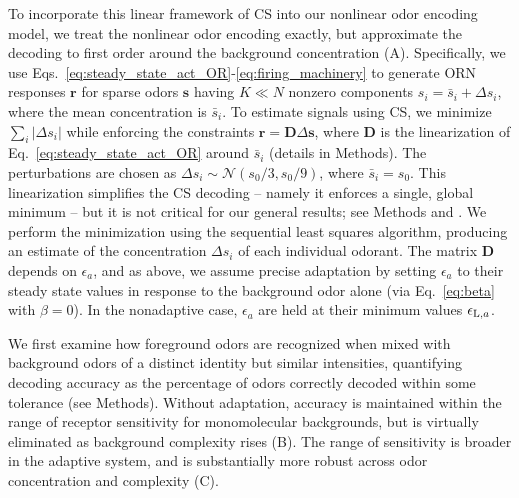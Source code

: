 \documentclass[9pt,lineno]{elife}
\begin{document}
To incorporate this linear framework of CS into our nonlinear odor encoding model, we treat the nonlinear odor encoding exactly, but approximate the decoding to first order around the background concentration (A). Specifically, we use Eqs.~\ref{eq:steady_state_act_OR}-\ref{eq:firing_machinery} to generate ORN responses $\mathbf r$ for sparse odors $\mathbf s$ having $K \ll N$ nonzero components $s_i = \bar{s}_i + \Delta s_i$, where the mean concentration is $\bar{s}_i$. To estimate  signals using CS, we minimize $\sum_i |\Delta s_i|$ while enforcing the constraints $\mathbf r = \mathbf D \Delta \mathbf s$, where $\mathbf D$ is the linearization of Eq.~\ref{eq:steady_state_act_OR} around $\bar{s}_i$ (details in Methods). {\color{blue} The perturbations are chosen as $\Delta s_i \sim \mathcal {N} (s_0/3, s_0/9)$, where $\bar{s}_i = s_0$. This linearization simplifies the CS decoding -- namely it enforces a single, global minimum  -- but it is not critical for our general results; see Methods and . We perform the minimization 
using the sequential least squares algorithm, producing an estimate of the concentration $\Delta s_i$ of each individual odorant. } The matrix $\mathbf D$ depends on $\epsilon_a$, and as above, we assume precise adaptation by setting $\epsilon_a$ to their steady state values in response to the background odor alone (via Eq.~\ref{eq:beta} with $\beta=0$). In the nonadaptive case, $\epsilon_a$ are held at their minimum values $\epsilon_{\textup L, a}$.


We first examine how foreground odors are recognized when mixed with background odors of a distinct identity but similar intensities, quantifying decoding accuracy as the percentage of odors correctly decoded within some tolerance (see Methods). Without adaptation, accuracy is maintained within the range of receptor sensitivity for monomolecular backgrounds, but is virtually eliminated as background complexity rises (B). The range of sensitivity is broader in the adaptive system, and is substantially more robust across odor concentration and complexity (C). 
\end{document}
